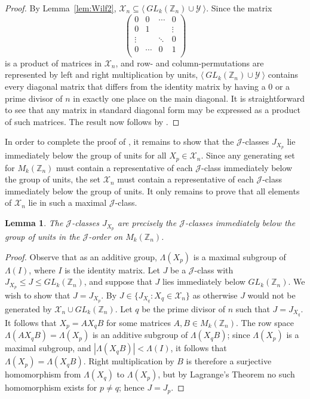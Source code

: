 \documentclass[11pt]{article}
\newtheorem{lemma}[thm]{Lemma}
\numberwithin{equation}{section}
\newcommand{\set}[2]{\ensuremath{\{#1 : #2 \}}}
\newcommand{\genset}[1]{\ensuremath{\langle\: #1 \:\rangle}}
\newcommand{\J}{\mathscr{J}}
\newcommand{\Z}{\mathbb{Z}}
\newcommand{\RowS}{\Lambda}
\begin{document}
\begin{proof}
  By Lemma~\ref{lem:Wilf2}, $\mathcal{X}_n \subseteq \genset{GL_k(\Z_n) \cup
    \mathcal{Y}}$.
  Since the matrix
  \[
  \begin{pmatrix}
      0       & 0      & \cdots & 0      \\
      0       & 1      &        & \vdots \\
      \vdots  &        & \ddots & 0      \\
      0       & \cdots & 0      & 1      \\
  \end{pmatrix}
\]
  is a product of matrices in $\mathcal{X}_n$, and row- and column-permutations
  are represented by left and right multiplication by units, $\genset{GL_k(\Z_n)
    \cup \mathcal{Y}}$ contains every diagonal matrix that differs from
  the identity matrix by having a $0$ or a prime divisor of $n$ in exactly one
  place on the main diagonal. It is straightforward to see that any matrix in
  standard diagonal form may be expressed as a product of such matrices. The
  result now follows by .
\end{proof}

In order to complete the proof of , it remains to show that
the $\J$-classes $J_{X_p}$ lie immediately below the group of units for all $X_p
\in \mathcal{X}_n$. Since any generating set for $M_k(\Z_n)$ must contain a
representative of each $\J$-class immediately below the group of units, the set
$\mathcal{X}_n$ must contain a representative of each $\J$-class immediately
below the group of units. It only remains to prove that all elements of
$\mathcal{X}_n$ lie in such a maximal $\J$-class.

\begin{lemma}
  \label{lem:ZnImmediatelyBelow}
  The $\J$-classes $J_{X_p}$ are precisely the $\J$-classes immediately below
  the group of units in the $\J$-order on $M_k(\Z_n)$.
\end{lemma}
\begin{proof}
Observe that as an additive group, $\RowS(X_p)$ is a maximal subgroup of
$\RowS(I)$, where $I$ is the identity matrix. Let $J$ be a $\J$-class with
$J_{X_p} \leq J \leq GL_k(\Z_n)$, and suppose that $J$ lies immediately below
$GL_k(\Z_n)$. We wish to show that $J = J_{X_p}$. By  $J \in
\set{J_{X_q}}{X_q \in \mathcal{X}_n}$ as otherwise $J$ would not be generated by
$\mathcal{X}_n \cup GL_k(\Z_n)$. Let $q$ be the prime divisor of $n$ such that
$J = J_{X_q}$. It follows that $X_p = AX_qB$ for some matrices $A, B \in
M_k(\Z_n)$. The row space $\RowS(AX_qB) = \RowS(X_p)$ is an additive subgroup of
$\RowS(X_qB)$; since $\RowS(X_p)$ is a maximal subgroup, and $|\RowS(X_qB)| <
\RowS(I)$, it follows that $\RowS(X_p) = \RowS(X_qB)$. Right multiplication by
$B$ is therefore a surjective homomorphism from $\RowS(X_q)$ to $\RowS(X_p)$,
but by Lagrange's Theorem no such homomorphism exists for $p \neq q$; hence $J =
J_p$.
\end{proof}

\printbibliography
\end{document}
